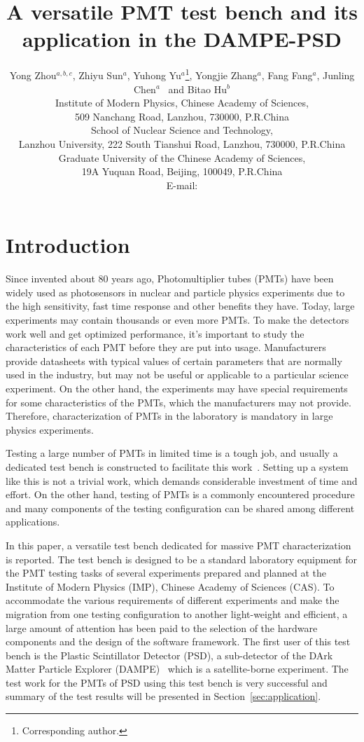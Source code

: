\documentclass{JINST}
\title{A versatile PMT test bench and its application in the DAMPE-PSD}
\author{Yong Zhou$^{a,b,c}$,
Zhiyu Sun$^a$,
Yuhong Yu$^a$\thanks{Corresponding author.},
Yongjie Zhang$^a$,
Fang Fang$^a$,
Junling Chen$^a$~
and Bitao Hu$^b$\\
\llap{$^a$}Institute of Modern Physics, Chinese Academy of Sciences,\\
           509 Nanchang Road, Lanzhou, 730000, P.R.China\\
\llap{$^b$}School of Nuclear Science and Technology,\\
           Lanzhou University, 222 South Tianshui Road, Lanzhou, 730000, P.R.China\\
\llap{$^c$}Graduate University of the Chinese Academy of Sciences,\\
           19A Yuquan Road, Beijing, 100049, P.R.China\\
E-mail: \email{yuyuhong@impcas.ac.cn}}
\begin{document}
\section{Introduction}
\label{sec:introduction}

Since invented about 80 years ago, Photomultiplier tubes (PMTs) have been widely used as photosensors in nuclear and particle physics experiments due to the high sensitivity, fast time response and other benefits they have. 
Today, large experiments may contain thousands or even more PMTs. To make the detectors work well and get optimized performance, it's important to study the characteristics of each PMT before they are put into usage. 
Manufacturers provide datasheets with typical values of certain parameters that are normally used in the industry, but may not be useful or applicable to a particular science experiment.
On the other hand, the experiments may have special requirements for some characteristics of the PMTs, which the manufacturers may not provide. 
Therefore, characterization of PMTs in the laboratory is mandatory in large physics experiments.

Testing a large number of PMTs in limited time is a tough job, and usually a dedicated test bench is constructed to facilitate this work~\cite{barnhill_testing_2008,akgun_complete_2005,adragna_pmt-block_2006}.
Setting up a system like this is not a trivial work, which demands considerable investment of time and effort.
On the other hand, testing of PMTs is a commonly encountered procedure and many components of the testing configuration can be shared among different applications.

In this paper, a versatile test bench dedicated for massive PMT characterization is reported.
The test bench is designed to be a standard laboratory equipment for the PMT testing tasks of several experiments prepared and planned at the Institute of Modern Physics (IMP), Chinese Academy of Sciences (CAS).
To accommodate the various requirements of different experiments and make the migration from one testing configuration to another light-weight and efficient, a large amount of attention has been paid to the selection of the hardware components and the design of the software framework.
The first user of this test bench is the Plastic Scintillator Detector (PSD), a sub-detector of the DArk Matter Particle Explorer (DAMPE)~\cite{Chang_Jin_dampe} which is a satellite-borne experiment. 
The test work for the PMTs of PSD using this test bench is very successful and summary of the test results will be presented in Section~\ref{sec:application}.
\end{document}
